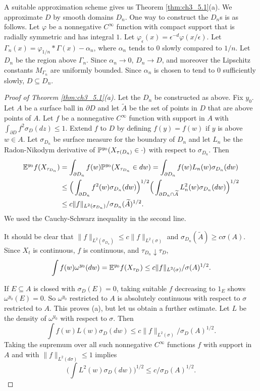 A suitable approximation scheme gives us Theorem \ref{thm:ch3_5.1}(a). We approximate $D$ by smooth domains $D_n$. One way to construct the $D_n$s is as follows. Let $\varphi$ be a nonnegative $C^\infty$ function with compact support that is radially symmetric and has integral $1$. Let $\varphi_\epsilon(x) = \epsilon^{-d}\varphi(x/\epsilon)$. Let $\Gamma_n(x) = \varphi_{1/n} * \Gamma(x) - \alpha_n$, where $\alpha_n$ tends to $0$ slowly compared to $1/n$. Let $D_n$ be the region above $\Gamma_n$. Since $\alpha_n \to 0$, $D_n \to D$, and moreover the Lipschitz constants $M_{\Gamma_n}$ are uniformly bounded. Since $\alpha_n$ is chosen to tend to $0$ sufficiently slowly, $D \subseteq D_n$.

\begin{proof}[Proof of Theorem \ref{thm:ch3_5.1}(a)]
Let the $D_n$ be constructed as above. Fix $y_0$. Let $A$ be a surface ball in $\partial D$ and let $\widetilde{A}$ be the set of points in $D$ that are above points of $A$. Let $f$ be a nonnegative $C^\infty$ function with support in $A$ with $\int_{\partial D} f^2\sigma_D(dz) \leq 1$. Extend $f$ to $D$ by defining $f(y) = f(w)$ if $y$ is above $w \in A$. Let $\sigma_{D_n}$ be surface measure for the boundary of $D_n$ and let $L_n$ be the Radon-Nikodym derivative of $\P^{y_0}(X_{\tau(D_n)} \in \cdot)$ with respect to $\sigma_{D_n}$. Then
\begin{align*}
    \E^{y_0}f(X_{\tau_{D_n}}) &= \int_{\partial D_n} f(w)\P^{y_0}(X_{\tau_{D_n}} \in dw) = \int_{\partial D_n} f(w)L_n(w)\sigma_{D_n}(dw) \\
    &\leq \Big(\int_{\partial D_n} f^2(w)\sigma_{D_n}(dw)\Big)^{1/2}\Big(\int_{\partial D_n \cap \widetilde{A}} L_n^2(w)\sigma_{D_n}(dw)\Big)^{1/2} \\
    &\leq c\|f\|_{L^2(\sigma_{D_n})}/\sigma_{D_n}(\widetilde{A})^{1/2}.
\end{align*}
We used the Cauchy-Schwarz inequality in the second line.

It should be clear that $\|f\|_{L^2(\sigma_{D_n})} \leq c\|f\|_{L^2(\sigma)}$ and $\sigma_{D_n}(\widetilde{A}) \geq c\sigma(A)$. Since $X_t$ is continuous, $f$ is continuous, and $\tau_{D_n} \downarrow \tau_D$,
\[
    \int f(w)\omega^{y_0}(dw) = \E^{y_0}f(X_{\tau_D}) \leq c\|f\|_{L^2(\sigma)}/\sigma(A)^{1/2}.
\]

If $E \subseteq A$ is closed with $\sigma_D(E) = 0$, taking suitable $f$ decreasing to $1_E$ shows $\omega^{y_0}(E) = 0$. So $\omega^{y_0}$ restricted to $A$ is absolutely continuous with respect to $\sigma$ restricted to $A$. This proves (a), but let us obtain a further estimate. Let $L$ be the density of $\omega^{y_0}$ with respect to $\sigma$. Then
\[
    \int f(w)L(w)\sigma_D(dw) \leq c\|f\|_{L^2(\sigma)}/\sigma_D(A)^{1/2}.
\]
Taking the supremum over all such nonnegative $C^\infty$ functions $f$ with support in $A$ and with $\|f\|_{L^2(d\sigma)} \leq 1$ implies
\begin{equation}\label{eq:ch3_5.13}
    \Big(\int L^2(w)\sigma_D(dw)\Big)^{1/2} \leq c/\sigma_D(A)^{1/2}.
\end{equation}
\end{proof}

